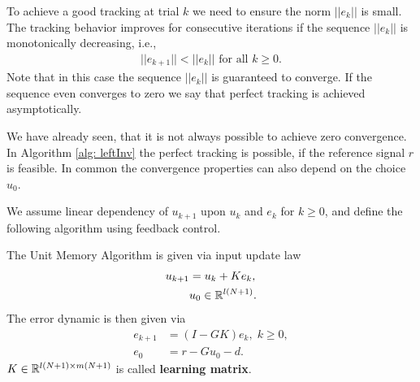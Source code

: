 To achieve a good tracking at trial $k$ we need to ensure the norm $||e_k||$ is small. 
The tracking behavior improves for consecutive iterations if the sequence $||e_k||$ is monotonically decreasing, i.e., 
\begin{align}
||e_{k+1} || < ||e_k|| \text{ for all } k \geq 0.
\end{align}
Note that in this case the sequence $||e_k||$ is guaranteed to converge. If the sequence even converges to zero we say that perfect tracking is achieved asymptotically.


We have already seen, that it is not always possible to achieve zero convergence. In Algorithm \ref{alg: leftInv} the perfect tracking is possible, if the reference signal $r$ is feasible. In common the convergence properties can also depend on the choice $u_0$.



We assume linear dependency of $u_{k+1}$ upon $u_k$ and $e_k$ for $k \geq 0$, and define the following algorithm using feedback control. 
\begin{alg}
	\label{alg: unitMemory}
	The Unit Memory Algorithm is given via input update law 
	\begin{align}
	\label{eq:clPlant}
	\begin{split}
	u_{k+1} &= u_k + K e_k, \\
	& u_0 \in {\mathbb{R}}^{l (N+1)}.
	\end{split}
	\end{align}	 
	The error dynamic is then given via
	\begin{align}
	e _{k+1} &= (I - G K) e_{k}, \; k \geq 0,\\
	e_0 &= r -  Gu_0 -d.
	\end{align}
	$K \in {\mathbb{R}}^{l(N+1) \times m(N+1)}$ is called \textbf{learning matrix}. 
\end{alg}

